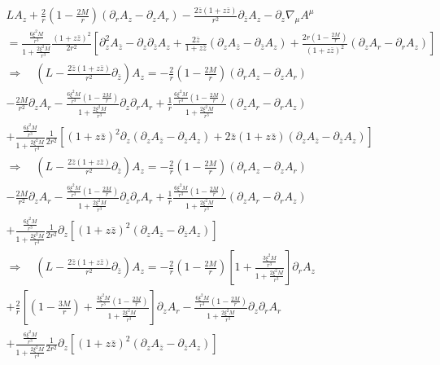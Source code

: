 \documentclass[12pt]{article}
\def\nn{\nonumber}
\begin{document}
\begin{gather}
L A_{z}
+
\frac{2}{r}
(1 - \frac{2 M}{r})
(\partial_{r} A_{z} - \partial_{z} A_{r})
-
\frac{2 \bar{z} (1 + z \bar{z})}{r^{2}}
\partial_{\bar{z}}
A_{z}
-
\partial_{z}
\nabla_{\mu}
A^{\mu}
\nn \\
=
\frac{\frac{6 \xi^{2} M}{r^{3}} }{1 + \frac{2 \xi^{2} M}{r^{3}}}
\frac{(1 + z \bar{z})^{2}}{2 r^{2}}
\left[
\partial_{z}^{2}A_{\bar{z}}
-
\partial_{z} \partial_{\bar{z}} A_{z}
+
\frac{2 \bar{z}}{1 + z \bar{z}}
(\partial_{z} A_{\bar{z}}
-
\partial_{\bar{z}} A_{z})
+
\frac{2 r (1 - \frac{2 M}{r})}{(1 + z \bar{z})^{2}}
(\partial_{z} A_{r}
-
\partial_{r} A_{z})
\right]
\nn \\
\Rightarrow
\quad
\left(L
-
\frac{2 \bar{z} (1 + z \bar{z})}{r^{2}}
\partial_{\bar{z}}
\right)
A_{z}
=
-
\frac{2}{r}
(1 - \frac{2 M}{r})
(\partial_{r} A_{z} - \partial_{z} A_{r})
\nn \\
-
\frac{2 M}{r^{2}}
\partial_{z}
A_{r}
-
\frac{\frac{6 \xi^{2} M}{r^{3}} (1 - \frac{2 M}{r})}{1 + \frac{2 \xi^{2} M}{r^{3}}}
\partial_{z}
\partial_{r}
A_{r}
+
\frac{1}{r}
\frac{\frac{6 \xi^{2} M}{r^{3}} (1 - \frac{2 M}{r}) }{1 + \frac{2 \xi^{2} M}{r^{3}}}
(\partial_{z} A_{r}
-
\partial_{r} A_{z})
\nn \\
+
\frac{\frac{6 \xi^{2} M}{r^{3}} }{1 + \frac{2 \xi^{2} M}{r^{3}}}
\frac{1}{2 r^{2}}
\left[
(1 + z \bar{z})^{2}
\partial_{z}
\left(
\partial_{z}A_{\bar{z}}
-
\partial_{\bar{z}} A_{z}
\right)
+
2 \bar{z}
(1 + z \bar{z})
(\partial_{z} A_{\bar{z}}
-
\partial_{\bar{z}} A_{z})
\right]
\nn \\
\Rightarrow
\quad
\left(L
-
\frac{2 \bar{z} (1 + z \bar{z})}{r^{2}}
\partial_{\bar{z}}
\right)
A_{z}
=
-
\frac{2}{r}
(1 - \frac{2 M}{r})
(\partial_{r} A_{z} - \partial_{z} A_{r})
\nn \\
-
\frac{2 M}{r^{2}}
\partial_{z}
A_{r}
-
\frac{\frac{6 \xi^{2} M}{r^{3}} (1 - \frac{2 M}{r})}{1 + \frac{2 \xi^{2} M}{r^{3}}}
\partial_{z}
\partial_{r}
A_{r}
+
\frac{1}{r}
\frac{\frac{6 \xi^{2} M}{r^{3}} (1 - \frac{2 M}{r}) }{1 + \frac{2 \xi^{2} M}{r^{3}}}
(\partial_{z} A_{r}
-
\partial_{r} A_{z})
\nn \\
+
\frac{\frac{6 \xi^{2} M}{r^{3}} }{1 + \frac{2 \xi^{2} M}{r^{3}}}
\frac{1}{2 r^{2}}
\partial_{z}
\left[
(1 + z \bar{z})^{2}
\left(
\partial_{z}A_{\bar{z}}
-
\partial_{\bar{z}} A_{z}
\right)
\right]
\nn \\
\Rightarrow
\quad
\left(L
-
\frac{2 \bar{z} (1 + z \bar{z})}{r^{2}}
\partial_{\bar{z}}
\right)
A_{z}
=
-
\frac{2}{r}
(1 - \frac{2 M}{r})
\left[
1
+
\frac{\frac{3 \xi^{2} M}{r^{3}}}{1 + \frac{2 \xi^{2} M}{r^{3}}}
\right]
\partial_{r} A_{z} 
\nn \\
+
\frac{2}{r}
\left[
(1 - \frac{3 M}{r})
+
\frac{\frac{3 \xi^{2} M}{r^{3}} (1 - \frac{2 M}{r}) }{1 + \frac{2 \xi^{2} M}{r^{3}}}
\right]
\partial_{z} A_{r}
-
\frac{\frac{6 \xi^{2} M}{r^{3}} (1 - \frac{2 M}{r})}{1 + \frac{2 \xi^{2} M}{r^{3}}}
\partial_{z}
\partial_{r}
A_{r}
\nn \\
+
\frac{\frac{6 \xi^{2} M}{r^{3}} }{1 + \frac{2 \xi^{2} M}{r^{3}}}
\frac{1}{2 r^{2}}
\partial_{z}
\left[
(1 + z \bar{z})^{2}
\left(
\partial_{z}A_{\bar{z}}
-
\partial_{\bar{z}} A_{z}
\right)
\right]
\end{gather}
\end{document}
